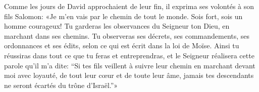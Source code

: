 Comme les jours de David approchaient de leur fin,
	il exprima ses volontés à son fils Salomon:
	«Je m’en vais par le chemin de tout le monde.
Sois fort, sois un homme courageux!
	Tu garderas les observances du Seigneur ton Dieu, en marchant dans ses chemins.
Tu observeras ses décrets, ses commandements, ses ordonnances et ses édits,
	selon ce qui est écrit dans la loi de Moïse.
Ainsi tu réussiras dans tout ce que tu feras et entreprendras,
	et le Seigneur réalisera cette parole qu’il m’a dite:
	“Si tes fils veillent à suivre leur chemin en marchant devant moi avec loyauté,
	de tout leur cœur et de toute leur âme,
	jamais tes descendants ne seront écartés du trône d’Israël.”»
